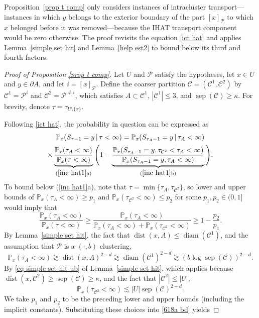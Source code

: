 \documentclass[11pt,reqno]{amsart}
\theoremstyle{definition}
\numberwithin{equation}{section}
\renewcommand{\P}{\mathbb{P}}
\newcommand{\1}{\mathbf{1}}
\newcommand{\bdy}{\partial}
\DeclareMathOperator{\dist}{dist}
\DeclareMathOperator{\diam}{diam}
\DeclareMathOperator{\sep}{sep}
\newcommand{\CC}{\mathcal{C}}
\begin{document}
Proposition~\ref{prop t comp} only considers instances of intracluster transport---instances in which $y$ belongs to the exterior boundary of the part $[x]_{\mathcal{P}}$ to which $x$ belonged before it was removed---because the IHAT transport component would be zero otherwise. The proof revisits the equation \eqref{ict hat} and applies Lemma~\ref{simple set hit} and Lemma~\ref{help est2} to bound below its third and fourth factors.

\begin{proof}[Proof of Proposition \ref{prop t comp}]
Let $U$ and $\mathcal{P}$ satisfy the hypotheses, let $x \in U$ and $y \in \bdy A$, and let $i = [x]_{\mathcal{P}}$. Define the coarser partition $\CC = (\CC^1, \CC^2)$ by $\CC^1 = \mathcal{P}^i$ and $\CC^2 = \mathcal{P}^{\neq i}$, which satisfies $A \subset \CC^1$, $|\CC^1| \leq 3$, and $\sep (\CC) \geq \kappa$. For brevity, denote $\tau = \tau_{U \setminus\{x\}}$.

Following \eqref{ict hat}, the probability in question can be expressed as 
\begin{multline}\label{inc hat1}
\P_x (S_{\tau-1} = y \,|\, \tau < \infty) = \P_x (S_{\tau_A-1} = y \,|\, \tau_A < \infty)\\ 
\times \underbrace{\frac{\P_{x} (\tau_A < \infty)}{\P_{x} (\tau < \infty)}}_{( \ref{inc hat1} \text{a})} \Bigg( 1
- \underbrace{\frac{\P_{x} (S_{\tau_A-1} = y, \tau_{\CC^2} < \tau_A < \infty)}{\P_{x} (S_{\tau_A-1} =y, \tau_A < \infty)}}_{( \ref{inc hat1} \text{b})} \Bigg).
\end{multline}
To bound below (\ref{inc hat1}a), note that $\tau = \min \{\tau_A, \tau_{\CC^2}\}$, so lower and upper bounds of $\P_x (\tau_A < \infty) \geq p_1$ and $\P_x (\tau_{\CC^2} < \infty) \leq p_2$ for some $p_1, p_2 \in (0,1]$ would imply that
\begin{equation}\label{618a bd}
\frac{\P_{x} (\tau_A < \infty)}{\P_{x} (\tau < \infty)} \geq \frac{\P_{x} (\tau_A < \infty)}{\P_{x} (\tau_A < \infty) + \P_x (\tau_{\CC^2} < \infty)} \geq 1 - \frac{p_2}{p_1}.
\end{equation} 
By Lemma~\ref{simple set hit}, the fact that $\dist (x,A) \leq \diam (\CC^1)$, and the assumption that $\mathcal{P}$ is a $(\cdot,b)$ clustering, 
\[
\P_x (\tau_A < \infty) \gtrsim \dist(x, A)^{2-d} \gtrsim \diam (\CC^1)^{2-d} \gtrsim \left( b \log \sep (\CC) \right)^{2-d}.
\]
By \eqref{eq simple set hit ub} of Lemma~\ref{simple set hit}, which applies because $\dist(x,\CC^2) \geq \sep (\CC) \geq \kappa$, and the fact that $|\CC^2| \leq |U|$, 
\[
\P_{x} (\tau_{\CC^2} < \infty) \lesssim |U| \sep (\CC)^{2-d}.
\]
We take $p_1$ and $p_2$ to be the preceding lower and upper bounds (including the implicit constants). Substituting these choices into \eqref{618a bd} yields



\end{proof}
\end{document}
